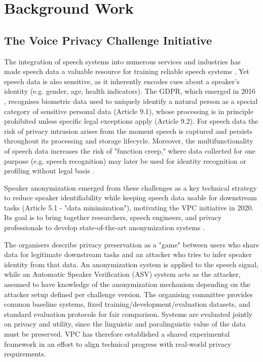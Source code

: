 \documentclass[12pt,leqno,a4paper]{article}
\begin{document}
\section{Background Work}
\label{sec:background_work}

\subsection{The Voice Privacy Challenge Initiative}
The integration of speech systems into numerous services and industries has made speech data a valuable resource for 
training reliable speech systems \citep{meyer2025usecasesvoiceanonymization}. Yet speech data is also sensitive, as it inherently encodes 
cues about a speaker's identity (e.g. gender, age, health indicators). The GDPR, which emerged in 2016 \citep{noauthor_recital_nodate}, 
recognises biometric data used to uniquely identify a natural person as a special category of sensitive personal data (Article 9.1), 
whose processing is in principle prohibited unless specific legal exceptions apply (Article 9.2). For speech data the risk of privacy intrusion arises from the moment speech is captured 
and persists throughout its processing and storage lifecycle. Moreover, the multifunctionality of speech data increases the risk of "function creep," 
where data collected for one purpose (e.g. speech recognition) may later be used for identity recognition or profiling without
legal basis \citep{nautsch_gdpr_2019}.

Speaker anonymization emerged from these challenges as a key technical strategy to reduce speaker identifiability while keeping speech data usable for downstream tasks (Article 5.1 - "data minimization"), 
motivating the VPC initiative in 2020. Its goal is to bring together researchers, speech engineers, and privacy professionals to develop 
state-of-the-art anonymization systems \citep{tomashenko_voiceprivacy_2022-1}.

The organisers describe privacy preservation as a "game" between users who share data for legitimate downstream tasks and an attacker who tries 
to infer speaker identity from that data. An anonymization system is applied to the speech signal, while an Automatic Speaker Verification (ASV) 
system acts as the attacker, assumed to have knowledge of the anonymization mechanism depending on the attacker setup defined per challenge version. 
The organising committee provides common baseline systems, fixed training/development/evaluation datasets, and standard evaluation protocols for 
fair comparison. Systems are evaluated jointly on privacy and utility, since the linguistic and paralinguistic value of the data must be preserved. 
VPC has therefore established a shared experimental framework in an effort to align technical progress with real-world privacy requirements.
\end{document}
